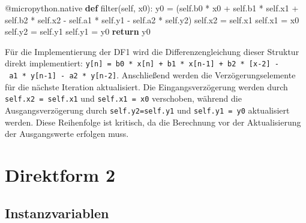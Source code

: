\documentclass[
  ngerman,
  letterpaper,
  DIV=11]{scrreprt}
\newenvironment{Shaded}{\begin{snugshade}}{\end{snugshade}}
\newcommand{\AttributeTok}[1]{\textcolor[rgb]{0.40,0.45,0.13}{#1}}
\newcommand{\BuiltInTok}[1]{\textcolor[rgb]{0.00,0.23,0.31}{#1}}
\newcommand{\ControlFlowTok}[1]{\textcolor[rgb]{0.00,0.23,0.31}{\textbf{#1}}}
\newcommand{\KeywordTok}[1]{\textcolor[rgb]{0.00,0.23,0.31}{\textbf{#1}}}
\newcommand{\NormalTok}[1]{\textcolor[rgb]{0.00,0.23,0.31}{#1}}
\newcommand{\OperatorTok}[1]{\textcolor[rgb]{0.37,0.37,0.37}{#1}}
\newcommand{\VariableTok}[1]{\textcolor[rgb]{0.07,0.07,0.07}{#1}}
\begin{document}
\begin{Shaded}
\begin{Highlighting}[]
    \AttributeTok{@micropython.native}
    \KeywordTok{def} \BuiltInTok{filter}\NormalTok{(}\VariableTok{self}\NormalTok{, x0):}
\NormalTok{        y0 }\OperatorTok{=}\NormalTok{ (}\VariableTok{self}\NormalTok{.b0 }\OperatorTok{*}\NormalTok{ x0 }\OperatorTok{+} \VariableTok{self}\NormalTok{.b1 }\OperatorTok{*} \VariableTok{self}\NormalTok{.x1 }\OperatorTok{+} \VariableTok{self}\NormalTok{.b2 }\OperatorTok{*} \VariableTok{self}\NormalTok{.x2 }
            \OperatorTok{{-}} \VariableTok{self}\NormalTok{.a1 }\OperatorTok{*} \VariableTok{self}\NormalTok{.y1 }\OperatorTok{{-}} \VariableTok{self}\NormalTok{.a2 }\OperatorTok{*} \VariableTok{self}\NormalTok{.y2)}
        \VariableTok{self}\NormalTok{.x2 }\OperatorTok{=} \VariableTok{self}\NormalTok{.x1}
        \VariableTok{self}\NormalTok{.x1 }\OperatorTok{=}\NormalTok{ x0}
        \VariableTok{self}\NormalTok{.y2 }\OperatorTok{=} \VariableTok{self}\NormalTok{.y1}
        \VariableTok{self}\NormalTok{.y1 }\OperatorTok{=}\NormalTok{ y0}
        \ControlFlowTok{return}\NormalTok{ y0}
\end{Highlighting}
\end{Shaded}

Für die Implementierung der DF1 wird die Differenzengleichung dieser
Struktur direkt implementiert:
\texttt{y{[}n{]}\ =\ b0\ *\ x{[}n{]}\ +\ b1\ *\ x{[}n-1{]}\ +\ b2\ *\ {[}x-2{]}\ -\ a1\ *\ y{[}n-1{]}\ -\ a2\ *\ y{[}n-2{]}}.
Anschließend werden die Verzögerungselemente für die nächste Iteration
aktualisiert. Die Eingangsverzögerung werden durch
\texttt{self.x2\ =\ self.x1} und \texttt{self.x1\ =\ x0} verschoben,
während die Ausgangsverzögerung durch \texttt{self.y2=self.y1} und
\texttt{self.y1\ =\ y0} aktualisiert werden. Diese Reihenfolge ist
kritisch, da die Berechnung vor der Aktualisierung der Ausgangswerte
erfolgen muss.

\section{Direktform 2}\label{direktform-2-1}

\subsection{Instanzvariablen}\label{instanzvariablen-1}
\end{document}
